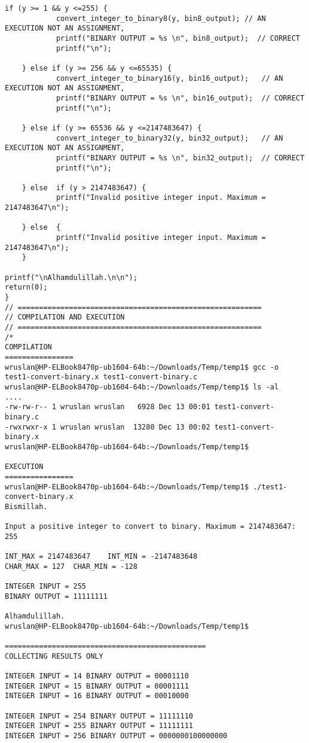 \begin{lstlisting}[caption={App4-Converting-software-codes-to-binary-bits-pulses}, label=App4-Converting-software-codes-to-binary-bits-pulses]
	if (y >= 1 && y <=255) {
			convert_integer_to_binary8(y, bin8_output);	// AN EXECUTION NOT AN ASSIGNMENT, 
			printf("BINARY OUTPUT = %s \n", bin8_output);  // CORRECT
			printf("\n");
		
	} else if (y >= 256 && y <=65535) {
			convert_integer_to_binary16(y, bin16_output);	// AN EXECUTION NOT AN ASSIGNMENT, 
			printf("BINARY OUTPUT = %s \n", bin16_output);  // CORRECT
			printf("\n");
	
	} else if (y >= 65536 && y <=2147483647) {
			convert_integer_to_binary32(y, bin32_output);	// AN EXECUTION NOT AN ASSIGNMENT, 
			printf("BINARY OUTPUT = %s \n", bin32_output);  // CORRECT
			printf("\n");
	
	} else  if (y > 2147483647) {
			printf("Invalid positive integer input. Maximum = 2147483647\n");
	
	} else  {
			printf("Invalid positive integer input. Maximum = 2147483647\n");
	}

printf("\nAlhamdulillah.\n\n");
return(0);
}
// =========================================================
// COMPILATION AND EXECUTION
// =========================================================
/*
COMPILATION
================
wruslan@HP-ELBook8470p-ub1604-64b:~/Downloads/Temp/temp1$ gcc -o test1-convert-binary.x test1-convert-binary.c 
wruslan@HP-ELBook8470p-ub1604-64b:~/Downloads/Temp/temp1$ ls -al
....
-rw-rw-r-- 1 wruslan wruslan   6928 Dec 13 00:01 test1-convert-binary.c
-rwxrwxr-x 1 wruslan wruslan  13280 Dec 13 00:02 test1-convert-binary.x
wruslan@HP-ELBook8470p-ub1604-64b:~/Downloads/Temp/temp1$ 

EXECUTION
================
wruslan@HP-ELBook8470p-ub1604-64b:~/Downloads/Temp/temp1$ ./test1-convert-binary.x 
Bismillah.

Input a positive integer to convert to binary. Maximum = 2147483647: 255

INT_MAX = 2147483647 	INT_MIN = -2147483648 
CHAR_MAX = 127 	CHAR_MIN = -128 

INTEGER INPUT = 255 
BINARY OUTPUT = 11111111 

Alhamdulillah.
wruslan@HP-ELBook8470p-ub1604-64b:~/Downloads/Temp/temp1$ 

===============================================
COLLECTING RESULTS ONLY

INTEGER INPUT = 14 BINARY OUTPUT = 00001110 
INTEGER INPUT = 15 BINARY OUTPUT = 00001111 
INTEGER INPUT = 16 BINARY OUTPUT = 00010000 

INTEGER INPUT = 254 BINARY OUTPUT = 11111110 
INTEGER INPUT = 255 BINARY OUTPUT = 11111111 
INTEGER INPUT = 256 BINARY OUTPUT = 0000000100000000 


\end{lstlisting}
